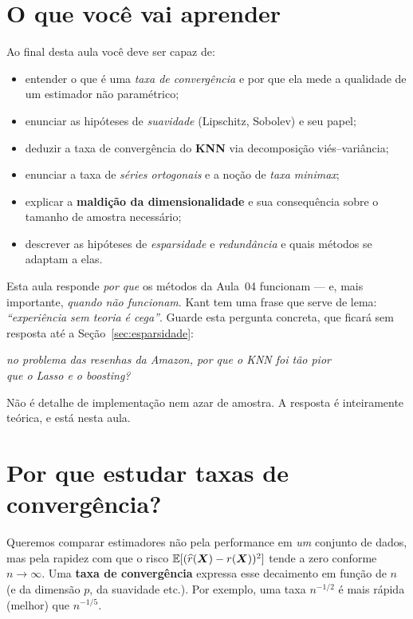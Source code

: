 \documentclass[11pt,a4paper]{article}
\title{}
\date{}
\begin{document}

\section*{O que você vai aprender}
Ao final desta aula você deve ser capaz de:
\begin{itemize}[leftmargin=1.4cm]
  \item entender o que é uma \emph{taxa de convergência} e por que ela mede a
        qualidade de um estimador não paramétrico;
  \item enunciar as hipóteses de \emph{suavidade} (Lipschitz, Sobolev) e seu papel;
  \item deduzir a taxa de convergência do \textbf{KNN} via decomposição
        viés--variância;
  \item enunciar a taxa de \emph{séries ortogonais} e a noção de \emph{taxa
        minimax};
  \item explicar a \textbf{maldição da dimensionalidade} e sua consequência sobre o
        tamanho de amostra necessário;
  \item descrever as hipóteses de \emph{esparsidade} e \emph{redundância} e quais
        métodos se adaptam a elas.
\end{itemize}

\noindent
Esta aula responde \emph{por que} os métodos da Aula~04 funcionam --- e, mais
importante, \emph{quando não funcionam}. Kant tem uma frase que serve de lema:
\emph{``experiência sem teoria é cega''}. Guarde esta pergunta concreta, que ficará
sem resposta até a Seção~\ref{sec:esparsidade}:

\begin{center}\itshape
  no problema das resenhas da Amazon, por que o KNN foi tão pior\\
  que o Lasso e o \emph{boosting}?
\end{center}

\noindent
Não é detalhe de implementação nem azar de amostra. A resposta é inteiramente
teórica, e está nesta aula.

\section{Por que estudar taxas de convergência?}
Queremos comparar estimadores não pela performance em \emph{um} conjunto de dados,
mas pela rapidez com que o risco $\mathbb{E}[(\widehat{r}(\bm{X})-r(\bm{X}))^2]$ tende a zero conforme
$n\to\infty$. Uma \textbf{taxa de convergência} expressa esse decaimento em função
de $n$ (e da dimensão $p$, da suavidade etc.). Por exemplo, uma taxa $n^{-1/2}$ é
mais rápida (melhor) que $n^{-1/5}$.
\end{document}
